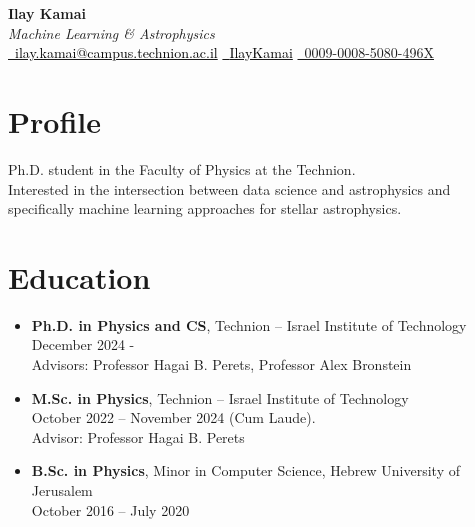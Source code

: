 \documentclass[11pt]{article}
\begin{document}
\begin{center}
    {\LARGE \textbf{Ilay Kamai}}\\
    \textit{Machine Learning \& Astrophysics} \\
    \vspace{0.5em}
    \href{mailto:ilay.kamai@campus.technion.ac.il}{\textcolor{black}
    {\faEnvelope}\ \textcolor{black}{ilay.kamai@campus.technion.ac.il}} \quad
    \href{https://github.com/IlayMalinyak}{\textcolor{black}
    {\faGithub}\ \textcolor{black}{IlayKamai}} \quad
    \href{https://orcid.org/my-orcid?orcid=0009-0008-5080-496X}{\textcolor{green!50!black}{\faOrcid}\ 0009-0008-5080-496X}
\end{center}

\vspace{1em}


\section*{Profile}
Ph.D. student in the Faculty of Physics at the Technion. \\ Interested in the intersection between data science and astrophysics and specifically machine learning approaches for stellar astrophysics.

\section*{Education}
\begin{itemize}[leftmargin=*]
 \item \textbf{Ph.D. in Physics and CS}, Technion – Israel Institute of Technology \\
  December 2024 - \\
  Advisors: Professor Hagai B. Perets, Professor Alex Bronstein
  \item \textbf{M.Sc. in Physics}, Technion – Israel Institute of Technology \\
  October 2022 -- November 2024 (Cum Laude). \\ Advisor: Professor Hagai B. Perets

  \item \textbf{B.Sc. in Physics}, Minor in Computer Science, Hebrew University of Jerusalem \\
  October 2016 -- July 2020

\end{itemize}
\end{document}

